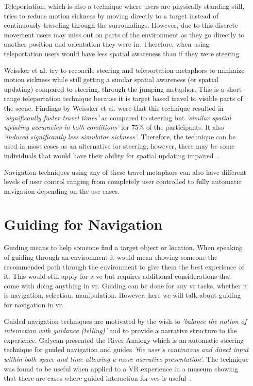 Teleportation, which is also a technique where users are physically standing still, tries to reduce motion sickness by moving directly to a target instead of continuously traveling through the surroundings. However, due to this discrete movement users may miss out on parts of the environment as they go directly to another position and orientation they were in. Therefore, when using teleportation users would have less spatial awareness than if they were steering.

Weissker et al. try to reconcile steering and teleportation metaphors to minimize motion sickness while still getting a similar spatial awareness (or spatial updating) compared to steering, through the jumping metaphor. This is a short-range teleportation technique because it is target based travel to visible parts of the scene. Findings by Weissker et al. were that this technique resulted in \textit{'significantly faster travel times'} as compared to steering but \textit{'similar spatial updating accuracies in both conditions'} for $75\%$ of the participants. It also \textit{'induced significantly less	simulator sickness'}. Therefore, the technique can be used in most cases as an alternative for steering, however, there may be some individuals that would have their ability for spatial updating impaired~\cite{Weissker2018}.

Navigation techniques using any of these travel metaphors can also have different levels of user control ranging from completely user controlled to fully automatic navigation depending on the use cases.

\section{Guiding for Navigation}
\label{section RW: Guiding for Navigation}
Guiding means to help someone find a target object or location. When speaking of guiding through an environment it would mean showing someone the recommended path through the environment to give them the best experience of it. This would still apply for a \acrshort{ve} but requires additional considerations that come with doing anything in \acrfull{vr}. Guiding can be done for any \acrshort{vr} tasks, whether it is navigation, selection, manipulation. However, here we will talk about guiding for navigation in \acrshort{vr}.

Guided navigation techniques are motivated by the wish to \textit{'balance the notion of interaction with guidance (telling)'} and to provide a narrative structure to the experience. Galyean presented the River Analogy which is an automatic steering technique for guided navigation and guides \textit{'the user’s continuous and direct input within both space and time allowing a more narrative presentation'}. The technique was found to be useful when applied to a VR experience in a museum showing that there are cases where guided interaction for \acrshort{ve}s is useful~\cite{Galyean1995}.

